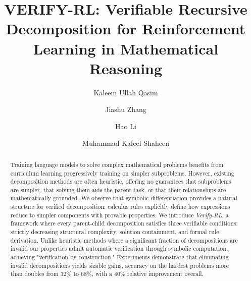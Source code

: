\documentclass[a4paper,fleqn]{cas-dc}
\theoremstyle{definition}
\begin{document}
\let\WriteBookmarks\relax
\def\floatpagepagefraction{1}
\def\textpagefraction{.001}



\title [mode = title]{VERIFY-RL: Verifiable Recursive Decomposition for Reinforcement Learning in Mathematical Reasoning}                      


\author[aff1]{Kaleem Ullah Qasim}

\author[aff1]{Jiashu Zhang}
\cormark[1] %
 
\author[aff1]{Hao Li}

\author[aff1]{Muhammad Kafeel Shaheen}


                   





\begin{abstract}
Training language models to solve complex mathematical problems benefits from curriculum learning progressively training on simpler subproblems. However, existing decomposition methods are often heuristic, offering no guarantees that subproblems are simpler, that solving them aids the parent task, or that their relationships are mathematically grounded. We observe that symbolic differentiation provides a natural structure for verified decomposition: calculus rules explicitly define how expressions reduce to simpler components with provable properties. We introduce \textit{Verify-RL}, a framework where every parent-child decomposition satisfies three verifiable conditions: strictly decreasing structural complexity, solution containment, and formal rule derivation. Unlike heuristic methods where a significant fraction of decompositions are invalid our properties admit automatic verification through symbolic computation, achieving "verification by construction." Experiments demonstrate that eliminating invalid decompositions yields sizable gains, accuracy on the hardest problems more than doubles from 32\% to 68\%, with a 40\% relative improvement overall.
\end{abstract}
\end{document}
